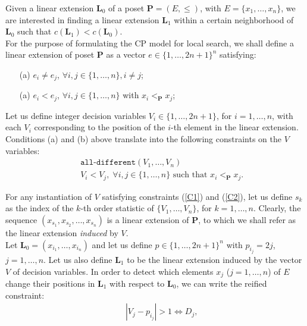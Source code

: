 \documentclass{llncs}
\begin{document}
Given a linear extension $\mathbf{L}_0$ of a poset ${\mathbf P}=(E,\leq)$, with $E=\{x_1,\ldots,x_n\}$, we are interested in finding a linear extension $\mathbf{L}_1$ within a certain neighborhood of $\mathbf{L}_0$ such that $c(\mathbf{L}_1) < c(\mathbf{L}_0)$.\\

For the purpose of formulating the CP model for local search, we shall define a linear extension of poset $\mathbf P$ as a vector $e \in \{1,\ldots,2n+1\}^{n}$ satisfying:\\

\begin{itemize}
\item[(a)] $e_i \neq e_j$, $\forall i,j \in \{1,\ldots,n\}, i \neq j$;\\
\item[(a)] $e_i < e_j$, $\forall i,j \in \{1,\ldots,n\}$ with $x_i <_{\mathbf P} x_j$;\\
\end{itemize}

Let us define integer decision variables $V_i \in \{1,\ldots,2n+1\}$, for $i=1,\ldots,n$, with each $V_i$ corresponding to the position of the $i$-th element in the linear extension.
Conditions (a) and (b) above translate into the following constraints on the $V$ variables:\\
\begin{eqnarray}
&& \texttt{all-different}(V_1,\ldots,V_n) \label{C1}\\
&& V_i < V_j, \; \forall i,j \in \{1,\ldots,n\} \mbox{ such that } x_i <_{\mathbf{P}} x_j.\label{C2}
\end{eqnarray}

For any instantiation of $V$ satisfying constraints (\ref{C1}) and (\ref{C2}), let us define $s_k$ as the index of the $k$-th order statistic of $\{V_1,\ldots,V_n\}$, for $k=1,\ldots,n$. Clearly, the sequence $\left(x_{s_1}, x_{s_2}, \ldots, x_{s_n}\right)$ is a linear extension of $\mathbf P$, to which we shall refer as the linear extension \emph{induced} by $V$.\\

Let $\mathbf{L}_0=\left(x_{i_1}, \ldots, x_{i_n}\right)$ and let us define $p \in \{1,\ldots,2n+1\}^n$ with $p_{i_j}=2j$, $j=1,\ldots,n$. Let us also define $\mathbf{L}_1$ to be the linear extension induced by the vector $V$ of decision variables. In order to detect which elements $x_j$ ($j=1,\ldots,n$) of $E$ change their positions in $\mathbf{L}_1$ with respect to $\mathbf{L}_0$, we can write the reified constraint:
\begin{eqnarray}
&& \left| V_j - p_{i_j} \right| > 1 \Leftrightarrow D_j,
\end{eqnarray}
\end{document}
